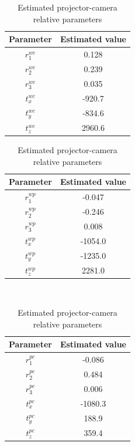 \begin{table}[ht]  
\parbox{.45\linewidth}{  
\centering  
\begin{tabular}{c c}  
\hline\noalign{\smallskip}  
Parameter & Estimated value \\  
\hline  
$r_1^{wc}$ & 0.128 \\  
$r_2^{wc}$ & 0.239 \\  
$r_3^{wc}$ & 0.035\\  
$t_x^{wc}$ & -920.7\\  
$t_y^{wc}$ & -834.6\\  
$t_z^{wc}$ & 2960.6\\  
\hline  
\end{tabular}   
\caption{Estimated camera extrinsic parameters}
\label{table:cam_extrinsics}
}  
\hfill  
\parbox{.45\linewidth}{  
\centering  
\begin{tabular}{c c}  
\hline\noalign{\smallskip}  
Parameter & Estimated value \\  
\hline  
$r_1^{wp}$ & -0.047 \\  
$r_2^{wp}$ & -0.246 \\  
$r_3^{wp}$ & 0.008\\  
$t_x^{wp}$ & -1054.0\\  
$t_y^{wp}$ & -1235.0\\  
$t_z^{wp}$ & 2281.0\\  
\hline  
\end{tabular}  
\caption{Estimated projector extrinsic parameters}  
\label{table:proj_extrinsics}
}\\  

\parbox{.45\linewidth}{
\centering  
\begin{tabular}{c c}  
\hline\noalign{\smallskip}  
Parameter & Estimated value \\  
\hline  
$r_1^{pc}$ & -0.086 \\  
$r_2^{pc}$ & 0.484 \\  
$r_3^{pc}$ & 0.006\\  
$t_x^{pc}$ & -1080.3\\  
$t_y^{pc}$ & 188.9\\  
$t_z^{pc}$ & 359.4\\  
\hline  
\end{tabular}  
\caption{Estimated projector-camera relative parameters}  
\label{table:cam_proj_extrinsics}
}  
\end{table}  
  
